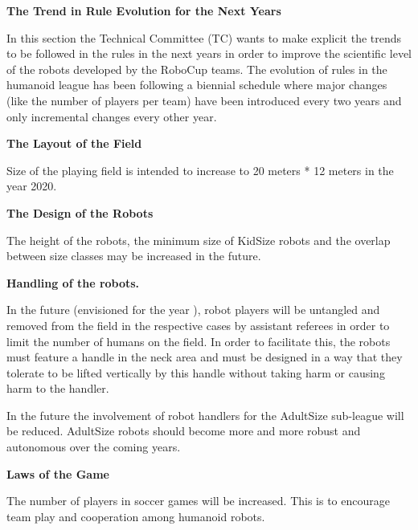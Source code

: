 \clearpage
\sffamily
{\bfseries\color[rgb]{0.4,0.4,0.4}
The Trend in Rule Evolution for the Next Years }

\bigskip

In this section the Technical Committee (TC) wants to make explicit the trends to be followed in the rules in the next years in order to improve the scientific level of the robots developed by the RoboCup teams. The evolution of rules in the humanoid league has been following
a biennial schedule where major changes (like the number of players per team) have been introduced every two years and only incremental changes every other year.

\bigskip

{\bfseries The Layout of the Field}

\headlinebox

Size of the playing field is intended to increase to 20 meters * 12 meters in the year 2020.

\bigskip

{\bfseries The Design of the Robots}

\headlinebox

The height of the robots, the minimum size of KidSize robots and the overlap between size classes may be increased in the future.
\bigskip


\bigskip

{\bfseries Handling of the robots.}

\headlinebox

In the future (envisioned for the year ), robot players will be untangled and removed from the field in the respective cases by assistant referees in order to limit the number of humans on the field. In order to facilitate this, the robots must feature a handle in the neck area and must be designed in a way that they tolerate to be lifted vertically by this handle without taking harm or causing harm to the handler.

\bigskip

In the future the involvement of robot handlers for the AdultSize sub-league will be reduced. AdultSize robots should become more and more robust and autonomous over the coming years.

\bigskip

{\bfseries Laws of the Game}

\headlinebox

The number of players in soccer games will be increased. This is to encourage team play and cooperation among humanoid robots.

\bigskip


\bigskip


